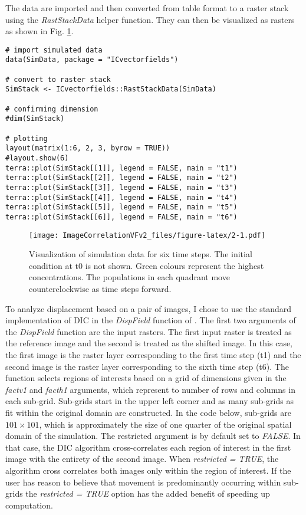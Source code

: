 The data are imported and then converted from table format to a raster stack using the \emph{RastStackData} helper function. They can then be visualized as rasters as shown in Fig. \ref{fig:2}.

\begin{verbatim}
# import simulated data
data(SimData, package = "ICvectorfields")

# convert to raster stack
SimStack <- ICvectorfields::RastStackData(SimData)

# confirming dimension
#dim(SimStack)

# plotting
layout(matrix(1:6, 2, 3, byrow = TRUE))
#layout.show(6)
terra::plot(SimStack[[1]], legend = FALSE, main = "t1")
terra::plot(SimStack[[2]], legend = FALSE, main = "t2")
terra::plot(SimStack[[3]], legend = FALSE, main = "t3")
terra::plot(SimStack[[4]], legend = FALSE, main = "t4")
terra::plot(SimStack[[5]], legend = FALSE, main = "t5")
terra::plot(SimStack[[6]], legend = FALSE, main = "t6")
\end{verbatim}

\begin{figure}
\centering
\texttt{[image: ImageCorrelationVFv2\_files/figure-latex/2-1.pdf]}
\caption{\label{fig:2}Visualization of simulation data for six time steps. The initial condition at t0 is not shown. Green colours represent the highest concentrations. The populations in each quadrant move counterclockwise as time steps forward.}
\end{figure}

To analyze displacement based on a pair of images, I chose to use the standard implementation of DIC in the
\emph{DispField} function of . The first two arguments of the \emph{DispField} function are the input rasters. The first input raster is treated as the reference image and the second is treated as the shifted image. In this case, the first image is the raster layer corresponding to the first time step (t1) and the second image is the raster layer corresponding to the sixth time step (t6). The function selects regions of interests based on a grid of dimensions given in the \emph{factv1} and \emph{facth1} arguments, which represent to number of rows and columns in each sub-grid. Sub-grids start in the upper left corner and as many sub-grids as fit within the original domain are constructed. In the code below, sub-grids are \(101 \times 101\), which is approximately the size of one quarter of the original spatial domain of the simulation. The restricted argument is by default set to \emph{FALSE}. In that case, the DIC algorithm cross-correlates each region of interest in the first image with the entirety of the second image. When \emph{restricted = TRUE}, the algorithm cross correlates both images only within the region of interest. If the user has reason to believe that movement is predominantly occurring within sub-grids the \emph{restricted = TRUE} option has the added benefit of speeding up computation.


